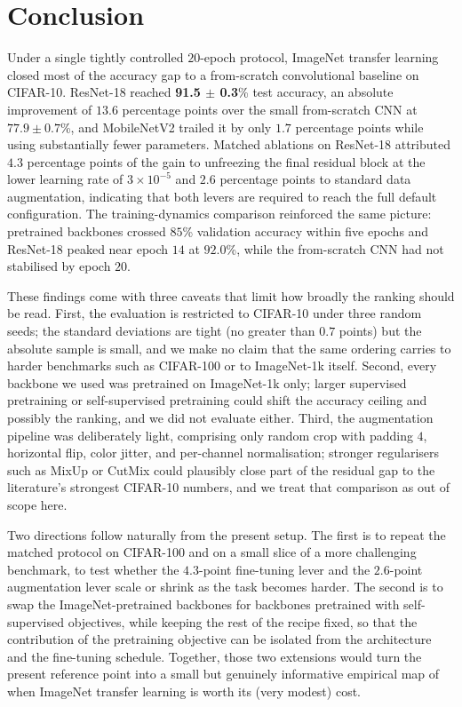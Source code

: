 \documentclass[10pt,twocolumn]{article}
\begin{document}
\section{Conclusion}
\label{sec:conclusion}

Under a single tightly controlled $20$-epoch protocol, ImageNet transfer learning closed most of the accuracy gap to a from-scratch convolutional baseline on CIFAR-10. ResNet-18 reached \textbf{91.5 $\pm$ 0.3}\% test accuracy, an absolute improvement of $13.6$ percentage points over the small from-scratch CNN at $77.9 \pm 0.7$\%, and MobileNetV2 trailed it by only $1.7$ percentage points while using substantially fewer parameters. Matched ablations on ResNet-18 attributed $4.3$ percentage points of the gain to unfreezing the final residual block at the lower learning rate of $3 \times 10^{-5}$ and $2.6$ percentage points to standard data augmentation, indicating that both levers are required to reach the full default configuration. The training-dynamics comparison reinforced the same picture: pretrained backbones crossed $85$\% validation accuracy within five epochs and ResNet-18 peaked near epoch $14$ at $92.0$\%, while the from-scratch CNN had not stabilised by epoch $20$.

These findings come with three caveats that limit how broadly the ranking should be read. First, the evaluation is restricted to CIFAR-10 under three random seeds; the standard deviations are tight (no greater than $0.7$ points) but the absolute sample is small, and we make no claim that the same ordering carries to harder benchmarks such as CIFAR-100 or to ImageNet-1k itself. Second, every backbone we used was pretrained on ImageNet-1k only; larger supervised pretraining or self-supervised pretraining could shift the accuracy ceiling and possibly the ranking, and we did not evaluate either. Third, the augmentation pipeline was deliberately light, comprising only random crop with padding $4$, horizontal flip, color jitter, and per-channel normalisation; stronger regularisers such as MixUp or CutMix could plausibly close part of the residual gap to the literature's strongest CIFAR-10 numbers, and we treat that comparison as out of scope here.

Two directions follow naturally from the present setup. The first is to repeat the matched protocol on CIFAR-100 and on a small slice of a more challenging benchmark, to test whether the $4.3$-point fine-tuning lever and the $2.6$-point augmentation lever scale or shrink as the task becomes harder. The second is to swap the ImageNet-pretrained backbones for backbones pretrained with self-supervised objectives, while keeping the rest of the recipe fixed, so that the contribution of the pretraining objective can be isolated from the architecture and the fine-tuning schedule. Together, those two extensions would turn the present reference point into a small but genuinely informative empirical map of when ImageNet transfer learning is worth its (very modest) cost.


\FloatBarrier


\end{document}
